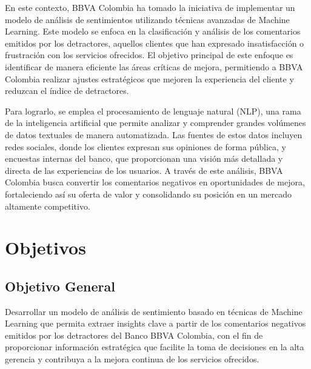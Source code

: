 \documentclass{matematicasud}
\begin{document}
En este contexto, BBVA Colombia ha tomado la iniciativa de implementar un modelo de análisis de sentimientos utilizando técnicas avanzadas de Machine Learning. Este modelo se enfoca en la clasificación y análisis de los comentarios emitidos por los detractores, aquellos clientes que han expresado insatisfacción o frustración con los servicios ofrecidos. El objetivo principal de este enfoque es identificar de manera eficiente las áreas críticas de mejora, permitiendo a BBVA Colombia realizar ajustes estratégicos que mejoren la experiencia del cliente y reduzcan el índice de detractores.

Para lograrlo, se emplea el procesamiento de lenguaje natural (NLP), una rama de la inteligencia artificial que permite analizar y comprender grandes volúmenes de datos textuales de manera automatizada. Las fuentes de estos datos incluyen redes sociales, donde los clientes expresan sus opiniones de forma pública, y encuestas internas del banco, que proporcionan una visión más detallada y directa de las experiencias de los usuarios. A través de este análisis, BBVA Colombia busca convertir los comentarios negativos en oportunidades de mejora, fortaleciendo así su oferta de valor y consolidando su posición en un mercado altamente competitivo.

\newpage
\section{Objetivos} 
\subsection{Objetivo General} 
Desarrollar un modelo de análisis de sentimiento basado en técnicas de Machine Learning que permita extraer insights clave a partir de los comentarios negativos emitidos por los detractores del Banco BBVA Colombia, con el fin de proporcionar información estratégica que facilite la toma de decisiones en la alta gerencia y contribuya a la mejora continua de los servicios ofrecidos.
\end{document}
